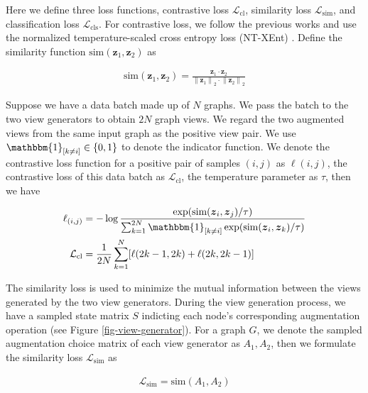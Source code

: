 Here we define three loss functions, contrastive loss $\mathcal{L}_{\text{cl}}$, similarity loss $\mathcal{L}_{\text{sim}}$, and classification loss $\mathcal{L}_{\text{cls}}$. For contrastive loss, we follow the previous works \cite{chen2020simclr,you2020graphcl} and use the normalized temperature-scaled cross entropy loss (NT-XEnt) \cite{sohn2016clloss}. Define the similarity function $\text{sim}(\boldsymbol{z}_1,\boldsymbol{z}_2)$ as
\begin{small}
    \begin{align}
    \text{sim}(\boldsymbol{z}_1,\boldsymbol{z}_2) = \frac{\boldsymbol{z}_1 \cdot \boldsymbol{z}_2}{ {\lVert \boldsymbol{z}_1 \rVert}_2 \cdot {\lVert \boldsymbol{z}_2 \rVert}_2 }
    \end{align}
\end{small}
Suppose we have a data batch made up of $N$ graphs. We pass the batch to the two view generators to obtain $2N$ graph views. We regard the two augmented views from the same input graph as the positive view pair. We use $\mathbbm{1}_{[k \neq i]} \in \{0, 1\}$ to denote the indicator function. We denote the contrastive loss function for a positive pair of samples $(i, j)$ as $\ell(i,j)$, the contrastive loss of this data batch as $\mathcal{L}_{\text{cl}}$, the temperature parameter as $\tau$, then we have
\begin{small}
    \begin{align}
    \ell_{(i,j)} &= - \log \frac{\exp ( \text{sim} (\boldsymbol{z}_i, \boldsymbol{z}_j) / \tau )}{ \sum_{k=1}^{2N} \mathbbm{1}_{[k \neq i]} \exp(\text{sim} (\boldsymbol{z}_i, \boldsymbol{z}_k) / \tau ) } \\
    \mathcal{L}_{\text{cl}} &= \frac{1}{2N} \sum_{k=1}^{N} [\ell(2k-1, 2k) + \ell(2k, 2k-1)]
    \end{align}
\end{small}
The similarity loss is used to minimize the mutual information between the views generated by the two view generators. During the view generation process, we have a sampled state matrix $S$ indicting each node's corresponding augmentation operation (see Figure \ref{fig-view-generator}). For a graph $G$, we denote the sampled augmentation choice matrix of each view generator as $A_1, A_2$, then we formulate the similarity loss $\mathcal{L}_{\text{sim}}$ as
\begin{small}
    \begin{align}
    \mathcal{L}_{\text{sim}} = \text{sim}(A_1, A_2)
    \end{align}
\end{small}
